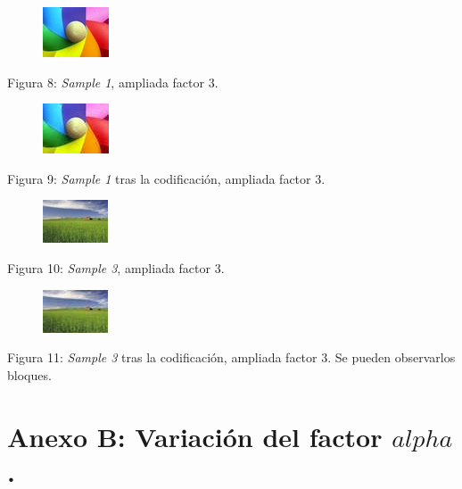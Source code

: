 \documentclass[%
final,
%
reprint,
%
notitlepage,
narroweqnarray,
inline,
twoside,
invited
]{ieee}
\begin{document}
\begin{thebibliography}{1}
\begin{figure}[H]
	\includegraphics[scale=3]{./img/sample_1_in.jpg}
\end{figure}
\begin{center}
\par Figura 8: \textit{Sample 1}, ampliada factor 3.
\end{center}

\begin{figure}[H]
	\includegraphics[scale=3]{./img/sample_1_alpha_1_out.jpg}
\end{figure}
\begin{center}
\par Figura 9: \textit{Sample 1} tras la codificación, ampliada factor 3.
\end{center}

\begin{figure}[H]
	\includegraphics[scale=3]{./img/sample_3_in.jpg}
\end{figure}
\begin{center}
\par Figura 10: \textit{Sample 3}, ampliada factor 3.
\end{center}

\begin{figure}[H]
	\includegraphics[scale=3]{./img/sample_3_alpha_1_out.jpg}
\end{figure}
\begin{center}
\par Figura 11: \textit{Sample 3} tras la codificación, ampliada factor 3. Se pueden observarlos bloques.
\end{center}

\section*{Anexo B: Variación del factor $alpha$.}


\end{thebibliography}
\end{document}
